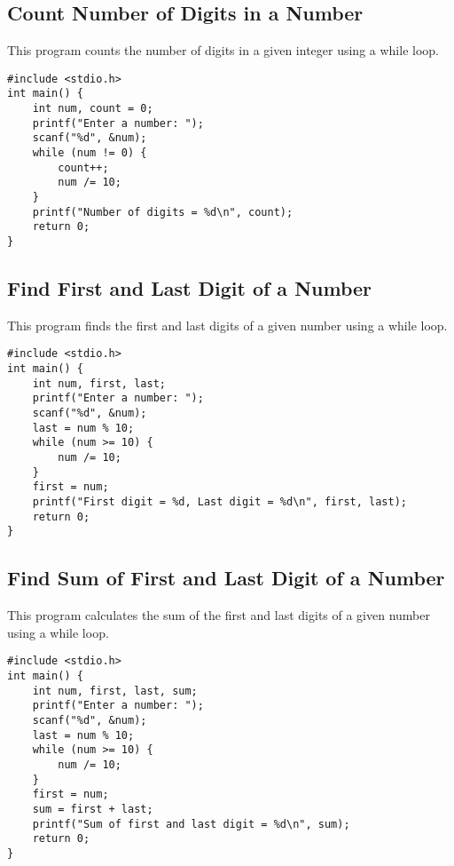 \documentclass[a4paper,12pt]{article}
\begin{document}
\subsection{Count Number of Digits in a Number}
This program counts the number of digits in a given integer using a while loop.

\begin{lstlisting}[caption={Count Number of Digits in a Number}]
#include <stdio.h>
int main() {
    int num, count = 0;
    printf("Enter a number: ");
    scanf("%d", &num);
    while (num != 0) {
        count++;
        num /= 10;
    }
    printf("Number of digits = %d\n", count);
    return 0;
}
\end{lstlisting}

\newpage

\subsection{Find First and Last Digit of a Number}
This program finds the first and last digits of a given number using a while loop.

\begin{lstlisting}[caption={Find First and Last Digit of a Number}]
#include <stdio.h>
int main() {
    int num, first, last;
    printf("Enter a number: ");
    scanf("%d", &num);
    last = num % 10;
    while (num >= 10) {
        num /= 10;
    }
    first = num;
    printf("First digit = %d, Last digit = %d\n", first, last);
    return 0;
}
\end{lstlisting}

\newpage

\subsection{Find Sum of First and Last Digit of a Number}
This program calculates the sum of the first and last digits of a given number using a while loop.

\begin{lstlisting}[caption={Find Sum of First and Last Digit of a Number}]
#include <stdio.h>
int main() {
    int num, first, last, sum;
    printf("Enter a number: ");
    scanf("%d", &num);
    last = num % 10;
    while (num >= 10) {
        num /= 10;
    }
    first = num;
    sum = first + last;
    printf("Sum of first and last digit = %d\n", sum);
    return 0;
}
\end{lstlisting}
\end{document}
